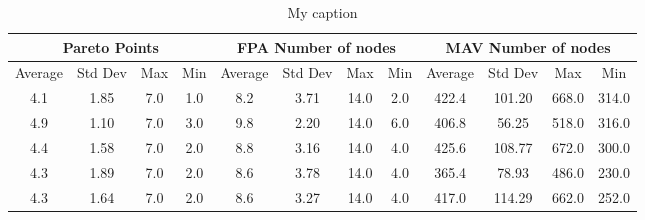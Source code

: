 \documentclass{article}
\begin{document}
	     \begin{table}[]
	     	\footnotesize
	     	\centering
	     	\caption{My caption}
	     	\label{table2}
	     	\begin{tabular}{cccccccccccc}
	     		\multicolumn{4}{|c|}{Pareto Points}                                                                             & \multicolumn{4}{c|}{FPA Number of nodes}                                                                       & \multicolumn{4}{c|}{MAV Number of nodes}                                                                       \\ \hline
	     		\multicolumn{1}{|c|}{Average} & \multicolumn{1}{c|}{Std Dev} & \multicolumn{1}{c|}{Max} & \multicolumn{1}{c|}{Min} & \multicolumn{1}{c|}{Average} & \multicolumn{1}{c|}{Std Dev} & \multicolumn{1}{c|}{Max} & \multicolumn{1}{c|}{Min} & \multicolumn{1}{c|}{Average} & \multicolumn{1}{c|}{Std Dev} & \multicolumn{1}{c|}{Max} & \multicolumn{1}{c|}{Min} \\ \hline
	     		4.1                        & 1.85                         & 7.0                      & 1.0                      & 8.2                       & 3.71                         & 14.0                     & 2.0                      & 422.4                     & 101.20                       & 668.0                    & 314.0                    \\
	     		4.9                        & 1.10                         & 7.0                      & 3.0                      & 9.8                       & 2.20                         & 14.0                     & 6.0                      & 406.8                     & 56.25                        & 518.0                    & 316.0                    \\
	     		4.4                        & 1.58                         & 7.0                      & 2.0                      & 8.8                       & 3.16                         & 14.0                     & 4.0                      & 425.6                     & 108.77                       & 672.0                    & 300.0                    \\
	     		4.3                        & 1.89                         & 7.0                      & 2.0                      & 8.6                       & 3.78                         & 14.0                     & 4.0                      & 365.4                     & 78.93                        & 486.0                    & 230.0                    \\
	     		4.3                        & 1.64                         & 7.0                      & 2.0                      & 8.6                       & 3.27                         & 14.0                     & 4.0                      & 417.0                     & 114.29                       & 662.0                    & 252.0                    \\

\end{tabular}
\end{table}
\end{document}
